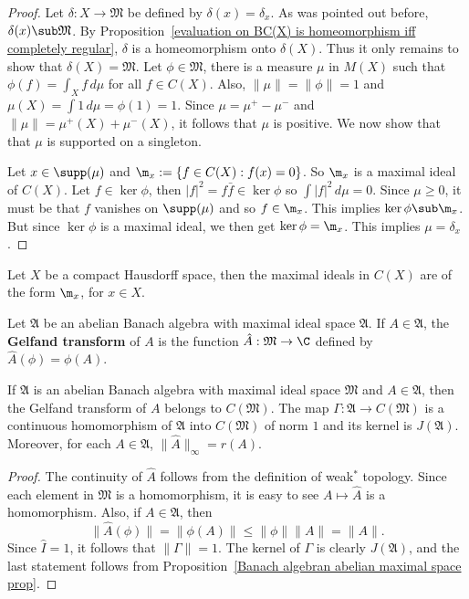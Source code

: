 \begin{proof}
Let $\delta:X\to\mathfrak{M}$ be defined by $\delta(x)=\delta_x$. As was pointed out before, $\delta(x)\sub\mathfrak{M}$. By Proposition~\ref{evaluation on BC(X) is homeomorphism iff completely regular}, $\delta$ is a homeomorphism onto $\delta(X)$. Thus it only remains to show that $\delta(X)=\mathfrak{M}$. Let $\phi\in\mathfrak{M}$, there is a measure $\mu$ in $M(X)$ such that $\phi(f)=\int_Xf\,d\mu$ for all $f\in C(X)$. Also, $\|\mu\|=\|\phi\|=1$ and $\mu(X)=\int 1\,d\mu=\phi(1)=1$. Since $\mu=\mu^+-\mu^-$ and $\|\mu\|=\mu^+(X)+\mu^-(X)$, it follows that $\mu$ is positive. We now show that that $\mu$ is supported on a singleton.\par
Let $x\in\supp(\mu)$ and $\m_x:=\{f\in C(X):f(x)=0\}$. So $\m_x$ is a maximal ideal of $C(X)$. Let $f\in\ker\phi$, then $|f|^2=f\bar{f}\in\ker\phi$ so $\int|f|^2\,d\mu=0$. Since $\mu\geq 0$, it must be that $f$ vanishes on $\supp(\mu)$ and so $f\in\m_x$. This implies $\ker\phi\sub\m_x$. But since $\ker\phi$ is a maximal ideal, we then get $\ker\phi=\m_x$. This implies $\mu=\delta_x$.
\end{proof}
\begin{corollary}
Let $X$ be a compact Hausdorff space, then the maximal ideals in $C(X)$ are of the form $\m_x$, for $x\in X$.
\end{corollary}
\begin{definition}
Let $\mathfrak{A}$ be an abelian Banach algebra with maximal ideal space $\mathfrak{A}$. If $A\in\mathfrak{A}$, the \textbf{Gelfand transform} of $A$ is the function $\hat{A}:\mathfrak{M}\to\C$ defined by $\hat{A}(\phi)=\phi(A)$.
\end{definition}
\begin{theorem}\label{Banach algebra Gelfand transform prop}
If $\mathfrak{A}$ is an abelian Banach algebra with maximal ideal space $\mathfrak{M}$ and $A\in\mathfrak{A}$, then the Gelfand transform of $A$ belongs to $C(\mathfrak{M})$. The map $\Gamma:\mathfrak{A}\to C(\mathfrak{M})$ is a continuous homomorphism of $\mathfrak{A}$ into $C(\mathfrak{M})$ of norm $1$ and its kernel is $J(\mathfrak{A})$. Moreover, for each $A\in\mathfrak{A}$, $\|\hat{A}\|_\infty=r(A)$.
\end{theorem}
\begin{proof}
The continuity of $\hat{A}$ follows from the definition of weak$^*$ topology. Since each element in $\mathfrak{M}$ is a homomorphism, it is easy to see $A\mapsto\hat{A}$ is a homomorphism. Also, if $A\in\mathfrak{A}$, then
\[\|\hat{A}(\phi)\|=\|\phi(A)\|\leq\|\phi\|\|A\|=\|A\|.\]
Since $\hat{I}=1$, it follows that $\|\Gamma\|=1$. The kernel of $\Gamma$ is clearly $J(\mathfrak{A})$, and the last statement follows from Proposition~\ref{Banach algebran abelian maximal space prop}.
\end{proof}
